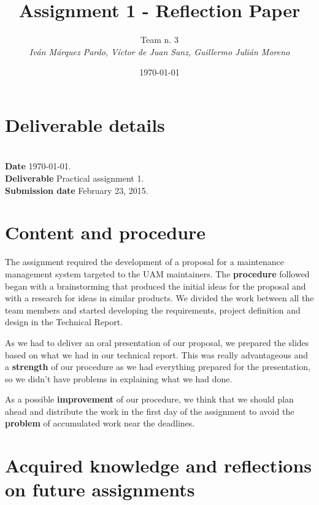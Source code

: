 \documentclass{article}
\title{Assignment 1 - Reflection Paper}
\date{\today}
\author{Team n. 3 \\ \vspace{5pt} \textit{Iván Márquez Pardo, Víctor de Juan Sanz, Guillermo Julián Moreno}}
\newcommand{\header}[1]{\\ \indent \textbf{#1}\hspace{10pt}}
\begin{document}
\maketitle
\pagestyle{plain}

\section{Deliverable details}

\noindent
\header{Date} \today.
\header{Deliverable} Practical assignment 1.
\header{Submission date} February 23, 2015.

\section{Content and procedure}

The assignment required the development of a proposal for a maintenance management system targeted to the UAM maintainers. The \textbf{procedure} followed began with a brainstorming that produced the initial ideas for the proposal and with a research for ideas in similar products. We divided the work between all the team members and started developing the requirements, project definition and design in the Technical Report.

As we had to deliver an oral presentation of our proposal, we prepared the slides based on what we had in our technical report. This was really advantageous and a \textbf{strength} of our procedure as we had everything prepared for the presentation, so we didn't have problems in explaining what we had done.

As a possible \textbf{improvement} of our procedure, we think that we should plan ahead and distribute the work in the first day of the assignment to avoid the \textbf{problem} of accumulated work near the deadlines.

\section{Acquired knowledge and reflections on future assignments}
\end{document}
